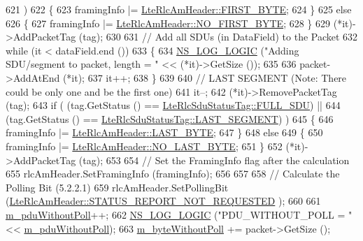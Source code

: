 \begin{DoxyCode}
621      )
622     \{
623       framingInfo |= \hyperlink{classns3_1_1LteRlcAmHeader_af42d22f1202bd0d8fa1f4cd0494b8b29a3b7a1fc289b74db76f2e76194d289a24}{LteRlcAmHeader::FIRST\_BYTE};
624     \}
625   \textcolor{keywordflow}{else}
626     \{
627       framingInfo |= \hyperlink{classns3_1_1LteRlcAmHeader_af42d22f1202bd0d8fa1f4cd0494b8b29a32b741f4f0b7c331632c185341ac9cb4}{LteRlcAmHeader::NO\_FIRST\_BYTE};
628     \}
629   (*it)->AddPacketTag (tag);
630 
631   \textcolor{comment}{// Add all SDUs (in DataField) to the Packet}
632   \textcolor{keywordflow}{while} (it < dataField.end ())
633     \{
634       \hyperlink{group__logging_ga88acd260151caf2db9c0fc84997f45ce}{NS\_LOG\_LOGIC} (\textcolor{stringliteral}{"Adding SDU/segment to packet, length = "} << (*it)->GetSize ());
635 
636       packet->AddAtEnd (*it);
637       it++;
638     \}
639 
640   \textcolor{comment}{// LAST SEGMENT (Note: There could be only one and be the first one)}
641   it--;
642   (*it)->RemovePacketTag (tag);
643   \textcolor{keywordflow}{if} ( (tag.GetStatus () == \hyperlink{classns3_1_1LteRlcSduStatusTag_ae7822c5cc0d54a3d193b09a91ed6f133ade41b0025c66cd211e992196f314d4a5}{LteRlcSduStatusTag::FULL\_SDU}) ||
644         (tag.GetStatus () == \hyperlink{classns3_1_1LteRlcSduStatusTag_ae7822c5cc0d54a3d193b09a91ed6f133a4e59540a0a5c4530b61e4feda355be7b}{LteRlcSduStatusTag::LAST\_SEGMENT}) )
645     \{
646       framingInfo |= \hyperlink{classns3_1_1LteRlcAmHeader_af0fb4ccf208128c7cf9dcabf02593749afae5968023949559fdf8d8ad9feb81cd}{LteRlcAmHeader::LAST\_BYTE};
647     \}
648   \textcolor{keywordflow}{else}
649     \{
650       framingInfo |= \hyperlink{classns3_1_1LteRlcAmHeader_af0fb4ccf208128c7cf9dcabf02593749af3f3cbb1727324b59b486aa955ce28f8}{LteRlcAmHeader::NO\_LAST\_BYTE};
651     \}
652   (*it)->AddPacketTag (tag);
653 
654   \textcolor{comment}{// Set the FramingInfo flag after the calculation}
655   rlcAmHeader.SetFramingInfo (framingInfo);
656 
657 
658   \textcolor{comment}{// Calculate the Polling Bit (5.2.2.1)}
659   rlcAmHeader.SetPollingBit (\hyperlink{classns3_1_1LteRlcAmHeader_a06187336c96896fc4de926e99ed4489ea747520569cdac2a16d0cb2dade280942}{LteRlcAmHeader::STATUS\_REPORT\_NOT\_REQUESTED}
      );
660 
661   \hyperlink{classns3_1_1LteRlcAm_ac7d9ac8a68b2b0ee696d217031df6b6b}{m\_pduWithoutPoll}++;
662   \hyperlink{group__logging_ga88acd260151caf2db9c0fc84997f45ce}{NS\_LOG\_LOGIC} (\textcolor{stringliteral}{"PDU\_WITHOUT\_POLL = "} << \hyperlink{classns3_1_1LteRlcAm_ac7d9ac8a68b2b0ee696d217031df6b6b}{m\_pduWithoutPoll});
663   \hyperlink{classns3_1_1LteRlcAm_abb7cacf0298d8cd90355cbe2a0ef4afd}{m\_byteWithoutPoll} += packet->GetSize ();

\end{DoxyCode}
